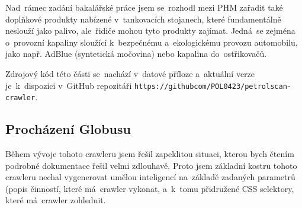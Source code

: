 Nad~rámec zadání bakalářské práce jsem se~rozhodl mezi PHM zařadit také
doplňkové produkty nabízené v~tankovacích stojanech, které fundamentálně
neslouží jako palivo, ale~řidiče mohou tyto produkty zajímat. Jedná~se
zejména o~provozní kapaliny sloužící k~bezpečnému a~ekologickému provozu
automobilu, jako např. AdBlue (syntetická močovina) nebo kapalina
do~ostřikovačů.

Zdrojový kód této části se~nachází v~datové příloze a~aktuální verze
je~k~dispozici v~GitHub repozitáři
\texttt{https://githubcom/POL0423/petrolscan-crawler}.

\subsection{Procházení Globusu}
\label{sec:crawling-globus}

Během vývoje tohoto crawleru jsem řešil zapeklitou situaci, kterou bych
čtením podrobné dokumentace řešil velmi zdlouhavě. Proto jsem základní
kostru tohoto crawleru nechal vygenerovat umělou inteligencí na~základě
zadaných parametrů (popis činností, které má~crawler vykonat, a~k~tomu
přidružené CSS selektory, které má~crawler zohlednit.
\cite{shCgjU2g2YA0ff8T} %

